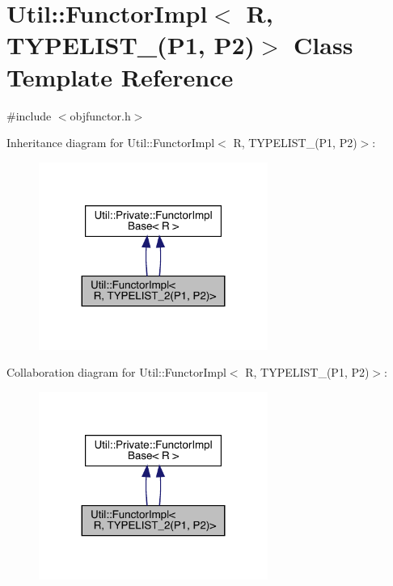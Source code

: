 \hypertarget{classUtil_1_1FunctorImpl_3_01R_00_01TYPELIST__2_07P1_00_01P2_08_4}{}\section{Util\+:\+:Functor\+Impl$<$ R, T\+Y\+P\+E\+L\+I\+S\+T\+\_(P1, P2)$>$ Class Template Reference}
\label{classUtil_1_1FunctorImpl_3_01R_00_01TYPELIST__2_07P1_00_01P2_08_4}


{\ttfamily \#include $<$objfunctor.\+h$>$}



Inheritance diagram for Util\+:\+:Functor\+Impl$<$ R, T\+Y\+P\+E\+L\+I\+S\+T\+\_(P1, P2)$>$\+:\nopagebreak
\begin{figure}[H]
\begin{center}
\leavevmode
\includegraphics[width=212pt]{d5/d1b/classUtil_1_1FunctorImpl_3_01R_00_01TYPELIST__2_07P1_00_01P2_08_4__inherit__graph}
\end{center}
\end{figure}


Collaboration diagram for Util\+:\+:Functor\+Impl$<$ R, T\+Y\+P\+E\+L\+I\+S\+T\+\_(P1, P2)$>$\+:\nopagebreak
\begin{figure}[H]
\begin{center}
\leavevmode
\includegraphics[width=212pt]{d9/dd2/classUtil_1_1FunctorImpl_3_01R_00_01TYPELIST__2_07P1_00_01P2_08_4__coll__graph}
\end{center}
\end{figure}
